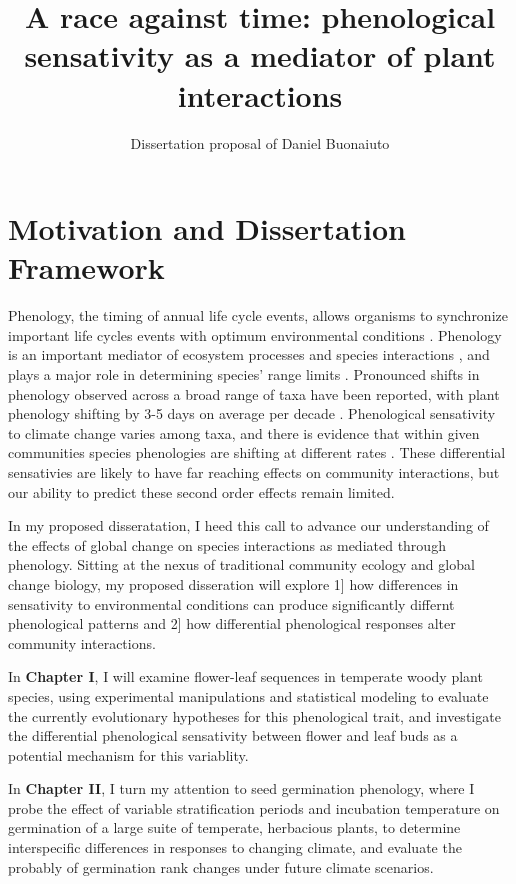 \documentclass{article}\usepackage[]{graphicx}\usepackage[]{color}
\begin{document}
\title{A race against time: phenological sensativity as a mediator of plant interactions}
\author{Dissertation proposal of Daniel Buonaiuto}
\maketitle{}
\section*{Motivation and Dissertation Framework}
\indent\indent Phenology, the timing of annual life cycle events, allows organisms to synchronize important life cycles events with optimum environmental conditions \citep{Forrest2010}. Phenology is an important mediator of ecosystem processes \citep{Piao2007,Cleland2007} and species interactions \citep{Yang2010,Leverett2017}, and plays a major role in determining species' range limits \citep{Chuine2001}. Pronounced shifts in phenology observed across a broad range of taxa have been reported, with plant phenology shifting by 3-5 days on average per decade \citep{Parmesan2003,Menzel2006,Root2003}. Phenological sensativity to climate change varies among taxa, and there is evidence that within given communities species phenologies are shifting at different rates \citep{Cleland2012,Ovaskainen2013}. These differential sensativies are likely to have far reaching effects on community interactions, but our ability to predict these second order effects remain limited.
\par In my proposed disseratation, I heed this call to advance our understanding of the effects of global change on species interactions as mediated through phenology. Sitting at the nexus of traditional community ecology and global change biology, my proposed disseration will explore 1] how differences in sensativity to environmental conditions can produce significantly differnt phenological patterns and 2] how differential phenological responses alter community interactions.
\par In \textbf{Chapter I}, I will examine flower-leaf sequences in temperate woody plant species, using experimental manipulations and statistical modeling to evaluate the currently evolutionary hypotheses for this phenological trait, and investigate the differential phenological sensativity between flower and leaf buds as a potential mechanism for this variablity.
\par In \textbf{Chapter II}, I turn my attention to seed germination phenology, where I probe the effect of variable stratification periods and incubation temperature on germination of a large suite of temperate, herbacious plants, to determine interspecific differences in responses to changing climate, and evaluate the probably of germination rank changes under future climate scenarios.
\end{document}
